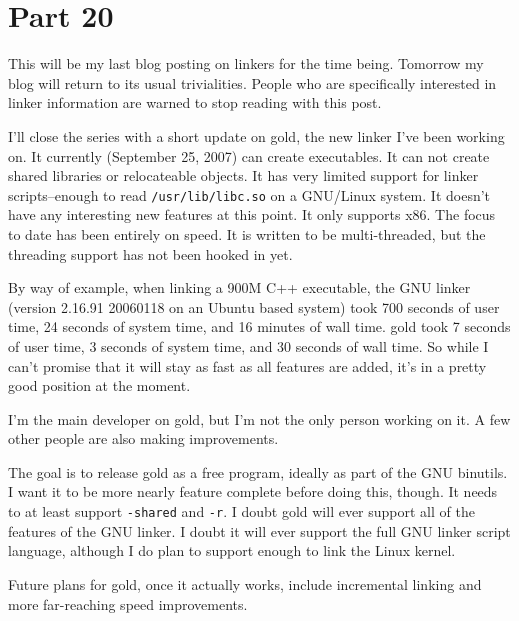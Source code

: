 \section{Part 20}

This will be my last blog posting on linkers for the time being. Tomorrow
my blog will return to its usual trivialities. People who are specifically
interested in linker information are warned to stop reading with this post.

I'll close the series with a short update on gold, the new linker I've been
working on. It currently (September 25, 2007) can create executables. It can
not create shared libraries or relocateable objects. It has very limited
support for linker scripts–enough to read \texttt{/usr/lib/libc.so} on a
GNU/Linux system. It doesn't have any interesting new features at this point.
It only supports x86. The focus to date has been entirely on speed. It is
written to be multi-threaded, but the threading support has not been hooked in
yet.

By way of example, when linking a 900M C++ executable, the GNU linker (version
2.16.91 20060118 on an Ubuntu based system) took 700 seconds of user time, 24
seconds of system time, and 16 minutes of wall time. gold took 7 seconds of
user time, 3 seconds of system time, and 30 seconds of wall time. So while I
can't promise that it will stay as fast as all features are added, it's in a
pretty good position at the moment.

I'm the main developer on gold, but I'm not the only person working on it. A
few other people are also making improvements.

The goal is to release gold as a free program, ideally as part of the GNU
binutils. I want it to be more nearly feature complete before doing this,
though. It needs to at least support \texttt{-shared} and \texttt{-r}. I doubt
gold will ever support all of the features of the GNU linker. I doubt it will
ever support the full GNU linker script language, although I do plan to support
enough to link the Linux kernel.

Future plans for gold, once it actually works, include incremental linking and
more far-reaching speed improvements.

